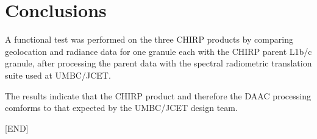 \documentclass[11pt]{article}
\begin{document}
\section{Conclusions}
\label{sec:orgac5d9fa}

A functional test was performed on the three CHIRP products by comparing geolocation and
radiance data for one granule each with the CHIRP parent L1b/c granule, after processing the
parent data with the spectral radiometric translation suite used at UMBC/JCET.

The results indicate that the CHIRP product and therefore the DAAC processing comforms to that expected by the UMBC/JCET design
team. 

[END]
\end{document}
